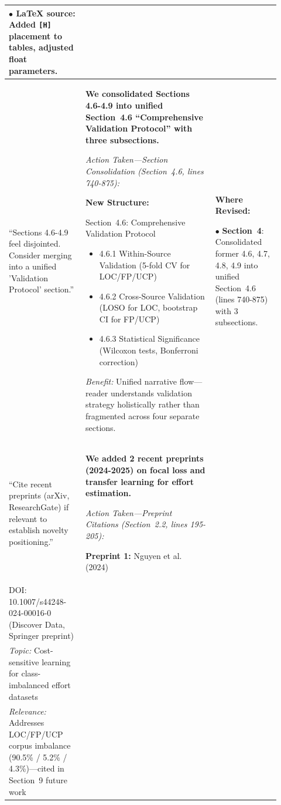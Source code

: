 \documentclass[11pt,a4paper]{article}
\begin{document}
\begin{longtable}{>{\raggedright\arraybackslash}p{0.26\linewidth}|>{\raggedright\arraybackslash}p{0.44\linewidth}|>{\raggedright\arraybackslash}p{0.22\linewidth}}
$\bullet$ \textbf{LaTeX source}: Added \texttt{[H]} placement to tables, adjusted float parameters. \\

\midrule

``Sections 4.6-4.9 feel disjointed. Consider merging into a unified 'Validation Protocol' section.'' &

\textbf{We consolidated Sections 4.6-4.9 into unified Section~4.6 ``Comprehensive Validation Protocol'' with three subsections.}

\textit{Action Taken---Section Consolidation (Section~4.6, lines 740-875):}

\textbf{New Structure:}

Section~4.6: Comprehensive Validation Protocol
\begin{itemize}
    \item 4.6.1 Within-Source Validation (5-fold CV for LOC/FP/UCP)
    \item 4.6.2 Cross-Source Validation (LOSO for LOC, bootstrap CI for FP/UCP)
    \item 4.6.3 Statistical Significance (Wilcoxon tests, Bonferroni correction)
\end{itemize}

\textit{Benefit:} Unified narrative flow---reader understands validation strategy holistically rather than fragmented across four separate sections. &

\textbf{Where Revised:}

$\bullet$ \textbf{Section~4}: Consolidated former 4.6, 4.7, 4.8, 4.9 into unified Section~4.6 (lines 740-875) with 3 subsections. \\

\midrule

``Cite recent preprints (arXiv, ResearchGate) if relevant to establish novelty positioning.'' &

\textbf{We added 2 recent preprints (2024-2025) on focal loss and transfer learning for effort estimation.}

\textit{Action Taken---Preprint Citations (Section~2.2, lines 195-205):}

\textbf{Preprint 1:} Nguyen et al. (2024)\\
DOI: 10.1007/s44248-024-00016-0 (Discover Data, Springer preprint)\\
\textit{Topic:} Cost-sensitive learning for class-imbalanced effort datasets\\
\textit{Relevance:} Addresses LOC/FP/UCP corpus imbalance (90.5\% / 5.2\% / 4.3\%)---cited in Section~9 future work


\end{longtable}
\end{document}
